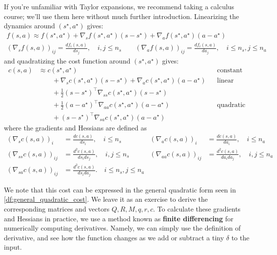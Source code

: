 \documentclass[../main/main]{subfiles}
\begin{document}
If you're unfamiliar with Taylor expansions, we recommend taking a calculus course; we'll use them here without much further introduction. Linearizing the dynamics around $(s^\star, a^\star)$ gives:
\begin{gather*}
    f(s, a) \approx f(s^\star, a^\star) + \nabla_s f(s^\star, a^\star) (s - s^\star) + \nabla_a f(s^\star, a^\star) (a - a^\star) \\
    (\nabla_s f(s, a))_{ij} = \frac{d f_i(s, a)}{d s_j}, \quad i, j \le n_s \qquad (\nabla_a f(s, a))_{ij} = \frac{d f_i(s, a)}{d a_j}, \quad i \le n_s, j \le n_a
\end{gather*}
and quadratizing the cost function around $(s^\star, a^\star)$ gives:
\begin{align*}
    c(s, a) &\approx c(s^\star, a^\star) && \text{constant} \\
    &\qquad + \nabla_s c(s^\star, a^\star) (s - s^\star) + \nabla_a c(s^\star, a^\star) (a - a^\star) && \text{linear} \\
    &\qquad + \frac{1}{2} (s - s^\star)^\top \nabla_{ss} c(s^\star, a^\star) (s - s^\star) \\
    &\qquad + \frac{1}{2} (a - a^\star)^\top \nabla_{aa} c(s^\star, a^\star) (a - a^\star) && \text{quadratic} \\
    &\qquad + (s - s^\star)^\top \nabla_{sa} c(s^\star, a^\star) (a - a^\star)
\end{align*}
where the gradients and Hessians are defined as
\begin{align*}
    (\nabla_s c(s, a))_{i} &= \frac{d c(s, a)}{d s_i}, \quad i \le n_s
    & (\nabla_a c(s, a))_{i} &= \frac{d c(s, a)}{d a_i}, \quad i \le n_a \\
    (\nabla_{ss} c(s, a))_{ij} &= \frac{d^2 c(s, a)}{d s_i d s_j}, \quad i, j \le n_s
    & (\nabla_{aa} c(s, a))_{ij} &= \frac{d^2 c(s, a)}{d a_i d a_j}, \quad i, j \le n_a \\
    (\nabla_{sa} c(s, a))_{ij} &= \frac{d^2 c(s, a)}{d s_i d a_j}. \quad i \le n_s, j \le n_a
\end{align*}

We note that this cost can be expressed in the general quadratic form seen in \autoref{df:general_quadratic_cost}.
We leave it as an exercise to derive the corresponding matrices and vectors $Q, R, M, q, r, c.$
To calculate these gradients and Hessians in practice, we use a method known as \textbf{finite differencing} for numerically computing derivatives.
Namely, we can simply use the definition of derivative, and see how the function changes as we add or subtract a tiny $\delta$ to the input.
\end{document}
